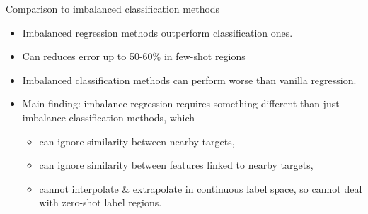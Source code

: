 \begin{frame}{Comparison to imbalanced classification methods}
\begin{table}[ht]
\begin{center}
{			}
		\end{center}
	\end{table}
	\begin{itemize}
		\item Imbalanced regression methods outperform classification ones.
		\item Can reduces error up to 50-60\% in few-shot regions
		\item Imbalanced classification methods can perform worse than vanilla regression.
		\item Main finding: imbalance regression requires something different than just imbalance classification methods, which
		\begin{itemize}
			\item can ignore similarity between nearby targets,
			\item can ignore similarity between features linked to nearby targets,
			\item cannot interpolate \& extrapolate in continuous label space, so cannot deal with zero-shot label regions.
		\end{itemize}
	\end{itemize}
\end{frame}